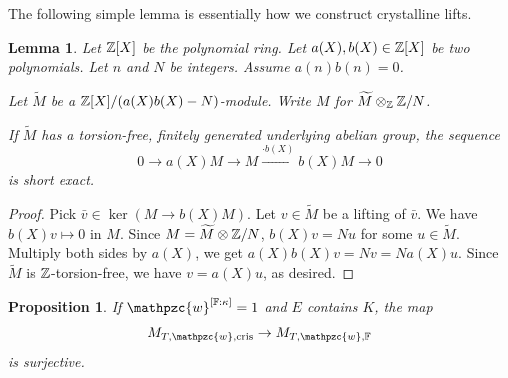 \documentclass[10pt,a4paper,twoside]{article}
\newtheorem{lem}{Lemma}
\newtheorem{prop}{Proposition}
\begin{document}
The following simple lemma is essentially how we construct crystalline lifts.


\begin{lem}
\label{lem:simple-trick}
Let ${\mathbb{Z}}[X]$ be the polynomial ring.
Let $a(X),b(X)\in {\mathbb{Z}}[X]$ be two polynomials.
Let $n$ and $N$ be integers.
Assume $a(n)b(n) = 0$.

Let $\widetilde{M}$ be a ${\mathbb{Z}}[X]/(a(X)b(X) - N)$-module.
Write $M$ for $\widetilde{M}\otimes_{{\mathbb{Z}}}{\mathbb{Z}}/N$.

If $\widetilde{M}$ has a torsion-free, finitely generated underlying abelian group,
the sequence
$$
0 \to a(X)M \to M \xrightarrow{\cdot b(X)} b(X) M \to 0
$$
is short exact.
\end{lem}

\begin{proof}
Pick $\bar v \in \ker (M \to b(X) M)$.
Let $v \in \widetilde{M}$ be a lifting of $\bar v$.
We have $b(X)v \mapsto 0$ in $M$.
Since $M = \widetilde{M} \otimes {\mathbb{Z}}/N$,
$b(X)v = N u$ for some $u\in \widetilde{M}$.
Multiply both sides by $a(X)$, we get
$a(X)b(X)v = Nv = N a(X) u$.
Since $\widetilde{M}$ is ${\mathbb{Z}}$-torsion-free, we have $v = a(X)u$, as desired.
\end{proof}


\begin{prop}
\label{prop:lift-inertia}
If $\mathpzc{w}^{[\bF: \kappa]}=1$ and $E$ contains $K$,
the map
$$
M_{T, \mathpzc{w}, \cris} \to M_{T, \mathpzc{w}, \modp}
$$
is surjective.
\end{prop}
\end{document}
